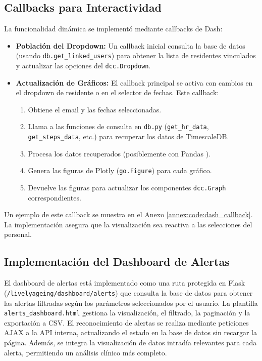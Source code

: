 \subsection{Callbacks para Interactividad}
La funcionalidad dinámica se implementó mediante callbacks de Dash:
\begin{itemize}
    \item \textbf{Población del Dropdown:} Un callback inicial consulta la base de datos (usando \texttt{db.get\_linked\_users}) para obtener la lista de residentes vinculados y actualizar las opciones del \texttt{dcc.Dropdown}.
    \item \textbf{Actualización de Gráficos:} El callback principal se activa con cambios en el dropdown de residente o en el selector de fechas. Este callback:
        \begin{enumerate}
            \item Obtiene el email y las fechas seleccionadas.
            \item Llama a las funciones de consulta en \texttt{db.py} (\texttt{get\_hr\_data}, \texttt{get\_steps\_data}, etc.) para recuperar los datos de TimescaleDB.
            \item Procesa los datos recuperados (posiblemente con Pandas \citep{pandas_docs}).
            \item Genera las figuras de Plotly (\texttt{go.Figure}) para cada gráfico.
            \item Devuelve las figuras para actualizar los componentes \texttt{dcc.Graph} correspondientes.
        \end{enumerate}
\end{itemize}
Un ejemplo de este callback se muestra en el Anexo \ref{annex:code:dash_callback}. La implementación asegura que la visualización sea reactiva a las selecciones del personal.

\subsection{Implementación del Dashboard de Alertas}
El dashboard de alertas está implementado como una ruta protegida en Flask (\texttt{/livelyageing/dashboard/alerts}) que consulta la base de datos para obtener las alertas filtradas según los parámetros seleccionados por el usuario. La plantilla \texttt{alerts\_dashboard.html} gestiona la visualización, el filtrado, la paginación y la exportación a CSV. El reconocimiento de alertas se realiza mediante peticiones AJAX a la API interna, actualizando el estado en la base de datos sin recargar la página. Además, se integra la visualización de datos intradía relevantes para cada alerta, permitiendo un análisis clínico más completo.

